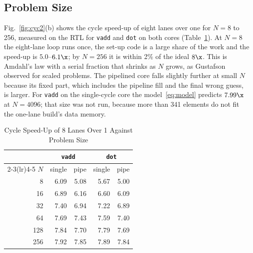 \subsection{Problem Size}
Fig.~\ref{fig:cyc2}(b) shows the cycle speed-up of eight lanes over one for $N = 8$ to
256, measured on the RTL for \texttt{vadd} and \texttt{dot} on both cores
(Table~\ref{tab:size}). At $N = 8$ the eight-lane loop runs once, the set-up code is a
large share of the work and the speed-up is $5.0$--$6.1\x$; by $N = 256$ it is within 2\%
of the ideal $8\x$. This is Amdahl's law with a serial fraction that shrinks as $N$
grows, as Gustafson~\cite{gustafson} observed for scaled problems. The pipelined core
falls slightly further at small $N$ because its fixed part, which includes the pipeline
fill and the final wrong guess, is larger. For \texttt{vadd} on the single-cycle core the
model~\eqref{eq:model} predicts $7.99\x$ at $N = 4096$; that size was not run, because
more than 341 elements do not fit the one-lane build's data memory.

\begin{table}[t]
\centering
\caption{Cycle Speed-Up of 8 Lanes Over 1 Against Problem Size}
\label{tab:size}
\footnotesize
\begin{tabular}{@{}rrrrr@{}}
\toprule
 & \multicolumn{2}{c}{\texttt{vadd}} & \multicolumn{2}{c}{\texttt{dot}} \\
\cmidrule(lr){2-3}\cmidrule(lr){4-5}
$N$ & single & pipe & single & pipe \\
\midrule
8   & 6.09 & 5.08 & 5.67 & 5.00 \\
16  & 6.89 & 6.16 & 6.60 & 6.09 \\
32  & 7.40 & 6.94 & 7.22 & 6.89 \\
64  & 7.69 & 7.43 & 7.59 & 7.40 \\
128 & 7.84 & 7.70 & 7.79 & 7.69 \\
256 & 7.92 & 7.85 & 7.89 & 7.84 \\
\bottomrule
\end{tabular}
\end{table}

